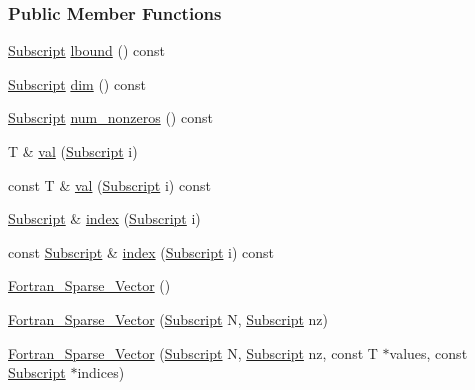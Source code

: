 \subsubsection*{Public Member Functions}
\begin{DoxyCompactItemize}
\item 
\hyperlink{namespace_t_n_t_af22e3f1460e145c04ce4e7d701e4c1c1}{Subscript} \hyperlink{class_t_n_t_1_1_fortran___sparse___vector_ac6c6ef1c582260166500a02130745f4b}{lbound} () const 
\item 
\hyperlink{namespace_t_n_t_af22e3f1460e145c04ce4e7d701e4c1c1}{Subscript} \hyperlink{class_t_n_t_1_1_fortran___sparse___vector_a6ca81f799f2cdac768e09c18e7e51b42}{dim} () const 
\item 
\hyperlink{namespace_t_n_t_af22e3f1460e145c04ce4e7d701e4c1c1}{Subscript} \hyperlink{class_t_n_t_1_1_fortran___sparse___vector_a07889124ca96d46efab58427480711ba}{num\_\-nonzeros} () const 
\item 
T \& \hyperlink{class_t_n_t_1_1_fortran___sparse___vector_a014d00672aff06aa5bbcd81589f1869b}{val} (\hyperlink{namespace_t_n_t_af22e3f1460e145c04ce4e7d701e4c1c1}{Subscript} i)
\item 
const T \& \hyperlink{class_t_n_t_1_1_fortran___sparse___vector_a17c5ece8ffc7368a3f80200b656f15d0}{val} (\hyperlink{namespace_t_n_t_af22e3f1460e145c04ce4e7d701e4c1c1}{Subscript} i) const 
\item 
\hyperlink{namespace_t_n_t_af22e3f1460e145c04ce4e7d701e4c1c1}{Subscript} \& \hyperlink{class_t_n_t_1_1_fortran___sparse___vector_ab4a7ebc8d692ea70f41cb653bdfd892f}{index} (\hyperlink{namespace_t_n_t_af22e3f1460e145c04ce4e7d701e4c1c1}{Subscript} i)
\item 
const \hyperlink{namespace_t_n_t_af22e3f1460e145c04ce4e7d701e4c1c1}{Subscript} \& \hyperlink{class_t_n_t_1_1_fortran___sparse___vector_a0a1c9d043ca900497130710c7b1dfeb5}{index} (\hyperlink{namespace_t_n_t_af22e3f1460e145c04ce4e7d701e4c1c1}{Subscript} i) const 
\item 
\hyperlink{class_t_n_t_1_1_fortran___sparse___vector_ab0f8a19e122c89f231721a4a9db94ee2}{Fortran\_\-Sparse\_\-Vector} ()
\item 
\hyperlink{class_t_n_t_1_1_fortran___sparse___vector_a3bc60c6985eef951a68bb2bcc79deca9}{Fortran\_\-Sparse\_\-Vector} (\hyperlink{namespace_t_n_t_af22e3f1460e145c04ce4e7d701e4c1c1}{Subscript} N, \hyperlink{namespace_t_n_t_af22e3f1460e145c04ce4e7d701e4c1c1}{Subscript} nz)
\item 
\hyperlink{class_t_n_t_1_1_fortran___sparse___vector_a2850c0f27a65647feacf21a0a3461ab5}{Fortran\_\-Sparse\_\-Vector} (\hyperlink{namespace_t_n_t_af22e3f1460e145c04ce4e7d701e4c1c1}{Subscript} N, \hyperlink{namespace_t_n_t_af22e3f1460e145c04ce4e7d701e4c1c1}{Subscript} nz, const T $\ast$values, const \hyperlink{namespace_t_n_t_af22e3f1460e145c04ce4e7d701e4c1c1}{Subscript} $\ast$indices)

\end{DoxyCompactItemize}
